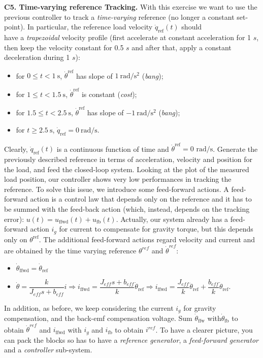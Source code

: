 \documentclass[11pt]{article}
\begin{document}
\par
\textbf{C5. Time-varying reference Tracking.} 
With this exercise we want to use the previous controller 
to track a \textit{time-varying} reference (no longer a constant set-point). 
In particular, the reference load velocity $\dot{q}_\mathrm{ref}(t)$ should \\
have a \textit{trapezoidal} velocity profile (first accelerate at constant acceleration for 1 $s$, 
then keep the velocity  constant for 0.5 $s$ and after that,  apply a constant deceleration during 1 $s$):
%
\begin{itemize}
    \item for $0\leq t < 1 \ \mathrm{s}$, $\dot{\theta}^\mathrm{ref}$ has slope of $1 \ \mathrm{rad/s^2}$ (\textit{bang});
    \item for $1\leq t < 1.5 \ \mathrm{s}$, $\dot{\theta}^\mathrm{ref}$ is constant (\textit{cost});
    \item for $1.5\leq t < 2.5 \ \mathrm{s}$, $\dot{\theta}^\mathrm{ref}$  has slope of $-1 \ \mathrm{rad/s^2}$ (\textit{bang});
    \item for $t \geq 2.5\ \mathrm{s}$, $\dot{q}_\mathrm{ref}=0 \ \mathrm{rad/s}$.
\end{itemize}
%
Clearly, $\dot{q}_\mathrm{ref}(t)$ is a continuous function of time 
and $\dot{\theta}^\mathrm{ref} = 0$  $\mathrm{rad/s}$. 
Generate the previously described reference in terms of acceleration, velocity and position for the load, 
and feed the closed-loop system. Looking at the plot of the measured load position, 
our controller shows very low performances in tracking the reference. 
To solve this issue, we introduce some feed-forward actions. 
A feed-forward action is a control law that depends only on the reference and it has to be summed 
with the feed-back action (which, instead, depends on the tracking error): 
$u(t) = u_{\mathrm{ffwd}}(t) + u_{\mathrm{fb}}(t)$. Actually, our system already has a 
feed-forward action $i_g$ for current to compensate for gravity torque, 
but this depends only on $\theta^{\mathrm{ref}}$. 
The additional feed-forward actions regard velocity and current 
and are obtained by the time varying reference $\theta^{ref}$ and $\dot{\theta}^{ref}$:
%
\begin{itemize}
    \item  $\dot{\theta}_{\mathrm{ffwd}} = \dot{\theta}_{\mathrm{ref}}$
    \item $\dot{\theta} = \dfrac{k}{J_{eff}s+b_{eff}} i \Rightarrow i_{\mathrm{ffwd}} = \dfrac{J_{eff}s + b_{eff}}{k}  \dot{\theta}_{\mathrm{ref}} \Rightarrow i_{\mathrm{ffwd}} = \dfrac{J_{eff}}{k} \ddot{\theta}_{\mathrm{ref}} +  \dfrac{b_{eff}}{k} \dot{\theta}_{\mathrm{ref}}$.
\end{itemize}

In addition, as before,  we keep considering the current $i_g$ for gravity compensation, and the back-emf compensation voltage.
Sum $\dot{\theta}_{\mathrm{ffw}}$   with$\dot{\theta}_{\mathrm{fb}}$ to obtain  $\dot{\theta}^{ref}$ and $i_{\mathrm{ffwd}}$ with $i_g$ and $i_{\mathrm{fb}}$ to obtain $i^{ref}$.
To have a clearer picture, you can pack the blocks so has to have a 
\textit{reference generator}, a \textit{feed-forward generator} and a \textit{controller} sub-system.
\end{document}
